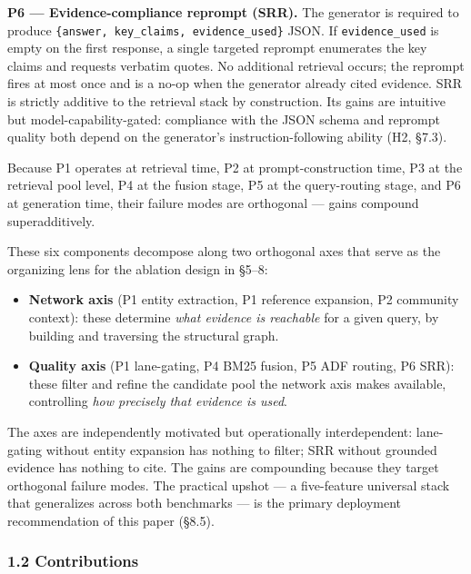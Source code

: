 \documentclass[
]{article}
\providecommand{\tightlist}{%
  \setlength{\itemsep}{0pt}\setlength{\parskip}{0pt}}
\begin{document}
\textbf{P6 --- Evidence-compliance reprompt (SRR).} The generator is
required to produce \texttt{\{answer,\ key\_claims,\ evidence\_used\}}
JSON. If \texttt{evidence\_used} is empty on the first response, a
single targeted reprompt enumerates the key claims and requests verbatim
quotes. No additional retrieval occurs; the reprompt fires at most once
and is a no-op when the generator already cited evidence. SRR is
strictly additive to the retrieval stack by construction. Its gains are
intuitive but model-capability-gated: compliance with the JSON schema
and reprompt quality both depend on the generator's
instruction-following ability (H2, §7.3).

Because P1 operates at retrieval time, P2 at prompt-construction time,
P3 at the retrieval pool level, P4 at the fusion stage, P5 at the
query-routing stage, and P6 at generation time, their failure modes are
orthogonal --- gains compound superadditively.

These six components decompose along two orthogonal axes that serve as
the organizing lens for the ablation design in §5--8:

\begin{itemize}
\tightlist
\item
  \textbf{Network axis} (P1 entity extraction, P1 reference expansion,
  P2 community context): these determine \emph{what evidence is
  reachable} for a given query, by building and traversing the
  structural graph.
\item
  \textbf{Quality axis} (P1 lane-gating, P4 BM25 fusion, P5 ADF routing,
  P6 SRR): these filter and refine the candidate pool the network axis
  makes available, controlling \emph{how precisely that evidence is
  used}.
\end{itemize}

The axes are independently motivated but operationally interdependent:
lane-gating without entity expansion has nothing to filter; SRR without
grounded evidence has nothing to cite. The gains are compounding because
they target orthogonal failure modes. The practical upshot --- a
five-feature universal stack that generalizes across both benchmarks ---
is the primary deployment recommendation of this paper (§8.5).

\subsubsection{1.2 Contributions}\label{contributions}
\end{document}

